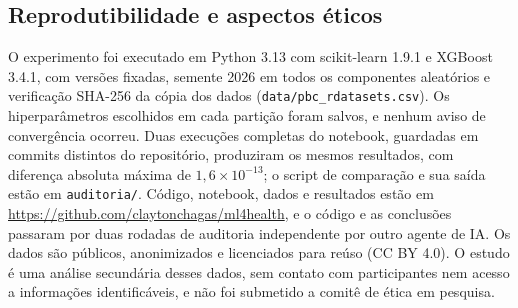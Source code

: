 \subsection{Reprodutibilidade e aspectos éticos}
O experimento foi executado em Python 3.13 com scikit-learn 1.9.1 e XGBoost 3.4.1, com versões fixadas, semente 2026 em todos os componentes aleatórios e verificação SHA-256 da cópia dos dados (\texttt{data/pbc\_rdatasets.csv}). Os hiperparâmetros escolhidos em cada partição foram salvos, e nenhum aviso de convergência ocorreu. Duas execuções completas do notebook, guardadas em commits distintos do repositório, produziram os mesmos resultados, com diferença absoluta máxima de $1{,}6 \times 10^{-13}$; o script de comparação e sua saída estão em \texttt{auditoria/}. Código, notebook, dados e resultados estão em \url{https://github.com/claytonchagas/ml4health}, e o código e as conclusões passaram por duas rodadas de auditoria independente por outro agente de IA. Os dados são públicos, anonimizados e licenciados para reúso (CC BY 4.0). O estudo é uma análise secundária desses dados, sem contato com participantes nem acesso a informações identificáveis, e não foi submetido a comitê de ética em pesquisa.
